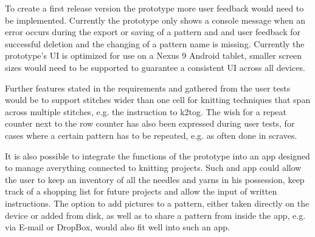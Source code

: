 To create a first release version the prototype more user feedback would need to be implemented. Currently the prototype only shows a console message when an error occurs during the export or saving of a pattern and and user feedback for successful deletion and the changing of a pattern name is missing. Currently the prototype's \gls{UI} is optimized for use on a Nexus 9 Android tablet, smaller screen sizes would need to be supported to guarantee a consistent \gls{UI} across all devices. 

Further features stated in the requirements and gathered from the user tests would be to support stitches wider than one cell for knitting techniques that span across multiple stitches, e.g. the instruction to \gls{k2tog}. The wish for a repeat counter next to the row counter has also been expressed during user tests, for cases where a certain pattern has to be repeated, e.g. as often done in scraves.

It is also possible to integrate the functions of the prototype into an app designed to manage averything connected to knitting projects. Such and app could allow the user to keep an inventory of all the needles and yarns in his possession, keep track of a shopping list for future projects and allow the input of written instructions. The option to add pictures to a pattern, either taken directly on the device or added from disk, as well as to share a pattern from inside the app, e.g. via E-mail or DropBox, would also fit well into such an app. 
